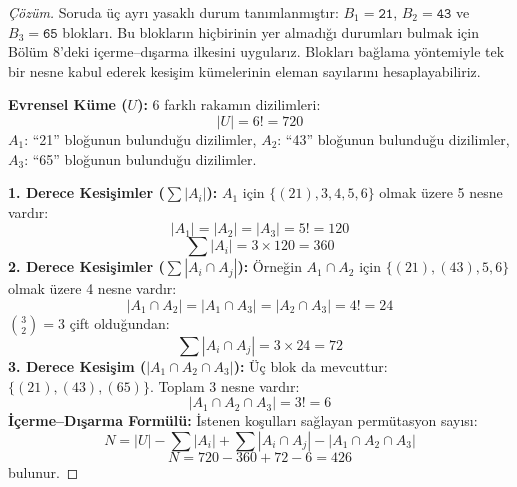 \begin{proof}[Çözüm]
Soruda üç ayrı yasaklı durum tanımlanmıştır: $B_1 = \texttt{21}$, $B_2 = \texttt{43}$ ve $B_3 = \texttt{65}$ blokları. Bu blokların hiçbirinin yer almadığı durumları bulmak için Bölüm 8'deki içerme--dışarma ilkesini uygularız. Blokları bağlama yöntemiyle tek bir nesne kabul ederek kesişim kümelerinin eleman sayılarını hesaplayabiliriz.

\textbf{Evrensel Küme ($U$):} 6 farklı rakamın dizilimleri:
\[
|U| = 6! = 720
\]
$A_1$: ``21'' bloğunun bulunduğu dizilimler,
$A_2$: ``43'' bloğunun bulunduğu dizilimler,
$A_3$: ``65'' bloğunun bulunduğu dizilimler.

\textbf{1. Derece Kesişimler ($\sum |A_i|$):}
$A_1$ için $\{ (21), 3, 4, 5, 6 \}$ olmak üzere 5 nesne vardır:
\[
|A_1| = |A_2| = |A_3| = 5! = 120
\]
\[
\sum |A_i| = 3 \times 120 = 360
\]
\textbf{2. Derece Kesişimler ($\sum |A_i \cap A_j|$):}
Örneğin $A_1 \cap A_2$ için $\{ (21), (43), 5, 6 \}$ olmak üzere 4 nesne vardır:
\[
|A_1 \cap A_2| = |A_1 \cap A_3| = |A_2 \cap A_3| = 4! = 24
\]
$\binom{3}{2} = 3$ çift olduğundan:
\[
\sum |A_i \cap A_j| = 3 \times 24 = 72
\]
\textbf{3. Derece Kesişim ($|A_1 \cap A_2 \cap A_3|$):}
Üç blok da mevcuttur: $\{ (21), (43), (65) \}$. Toplam 3 nesne vardır:
\[
|A_1 \cap A_2 \cap A_3| = 3! = 6
\]
\textbf{İçerme--Dışarma Formülü:}
İstenen koşulları sağlayan permütasyon sayısı:
\[
N = |U| - \sum |A_i| + \sum |A_i \cap A_j| - |A_1 \cap A_2 \cap A_3|
\]
\[
N = 720 - 360 + 72 - 6 = 426
\]
bulunur.
\end{proof}

